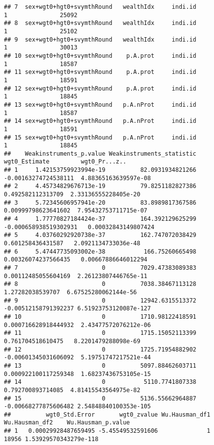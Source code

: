 \documentclass[
]{book}
\begin{document}
\begin{verbatim}
## 7  sex+wgt0+hgt0+svymthRound   wealthIdx     indi.id                   1               25092
## 8  sex+wgt0+hgt0+svymthRound   wealthIdx     indi.id                   1               25102
## 9  sex+wgt0+hgt0+svymthRound   wealthIdx     indi.id                   1               30013
## 10 sex+wgt0+hgt0+svymthRound    p.A.prot     indi.id                   1               18587
## 11 sex+wgt0+hgt0+svymthRound    p.A.prot     indi.id                   1               18591
## 12 sex+wgt0+hgt0+svymthRound    p.A.prot     indi.id                   1               18845
## 13 sex+wgt0+hgt0+svymthRound   p.A.nProt     indi.id                   1               18587
## 14 sex+wgt0+hgt0+svymthRound   p.A.nProt     indi.id                   1               18591
## 15 sex+wgt0+hgt0+svymthRound   p.A.nProt     indi.id                   1               18845
##    Weakinstruments_p.value Weakinstruments_statistic         wgt0_Estimate         wgt0_Pr...z..
## 1     1.42153759923994e-19          82.0931934821266  -0.00163274724538111  4.88365163639597e-08
## 2     4.45734829676713e-19          79.8251182827386     0.492582112313709  2.33136555228405e-20
## 3     5.72345606957941e-20          83.8989817367586   0.00999798623641602  7.95432753711715e-07
## 4     1.77770827184424e-37          164.392129625299 -0.000658938519302931   0.00032843149807424
## 5     4.03760292920738e-37          162.747072038429     0.601258436431587   2.0921134733036e-48
## 6     5.47447735093002e-38           166.75260665498   0.00326074237566435   0.00667886646012294
## 7                        0          7029.47383089383   0.00112485055604169  2.26123807446765e-11
## 8                        0          7038.38467113128      1.27282038539707  6.67525280062144e-56
## 9                        0          12942.6315513372  -0.00512158791392237 6.51923753120087e-127
## 10                       0          1710.98122418591  0.000716628918444932  2.43477572076212e-06
## 11                       0          1715.15052113399     0.761704518610475   8.2201479288098e-69
## 12                       0          1725.71954882902  -0.00601345031606092  5.19751747217521e-44
## 13                       0          5097.88462603711  0.000922100117259348  1.68237436753105e-15
## 14                       0           5110.7741807338     0.792700893714085  4.81415543564975e-82
## 15                       0          5136.55662964887  -0.00668277875606482 2.54848840100353e-105
##          wgt0_Std.Error       wgt0_zvalue Wu.Hausman_df1 Wu.Hausman_df2    Wu.Hausman_p.value
## 1   0.00029928487659495 -5.45549532591606              1          18956 1.53929570343279e-118

\end{verbatim}
\end{document}
